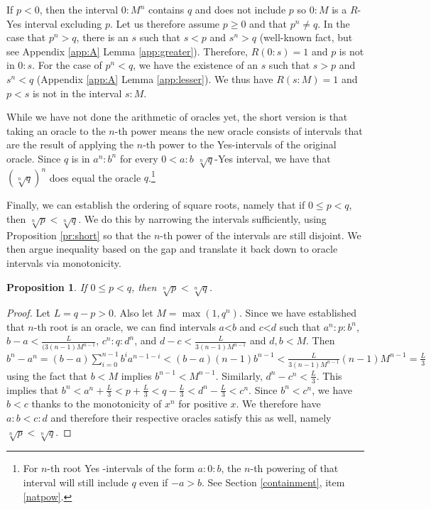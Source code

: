 \documentclass[12pt]{article}
\newtheorem{proposition}{Proposition}
\theoremstyle{remark}
\newcommand{\lt}{\mathord{<}}
\begin{document}
\begin{enumerate}
    If $p < 0$, then the interval $0:M^n$ contains $q$ and does not include $p$ so $0:M$ is a $R$-Yes interval excluding $p$. Let us therefore assume $p \geq 0$ and that $p^n \neq q$. In the case that $p^n > q$, there is an $s$ such that $s<p$ and $s^n > q$ (well-known fact, but see Appendix \ref{app:A} Lemma \ref{app:greater}). Therefore, $R(0:s) = 1$ and $p$ is not in $0:s$. For the case of $p^n < q$, we have the existence of an $s$ such that $s > p$ and $s^n < q$ (Appendix \ref{app:A} Lemma \ref{app:lesser}). We thus have $R(s:M)=1$ and $p < s$ is not in the interval $s:M$.
    
\end{enumerate}

While we have not done the arithmetic of oracles yet, the short version is that taking an oracle to the $n$-th power means the new oracle consists of intervals that are the result of applying the $n$-th power to the Yes-intervals of the original oracle. Since $q$ is in $a^n:b^n$ for every $0<a:b$ $\sqrt[n]{q}$-Yes interval, we have that $(\sqrt[n]{q})^n$ does equal the oracle $q$.\footnote{For $n$-th root Yes -intervals of the form $a:0:b$, the $n$-th powering of that interval will still include $q$ even if $-a>b$. See Section \ref{containment}, item \ref{natpow}.} 

Finally, we can establish the ordering of square roots, namely that if $0 \leq p<q$, then $\sqrt[n]{p} < \sqrt[n]{q}$. We do this by narrowing the intervals sufficiently, using Proposition \ref{pr:short} so that the $n$-th power of the intervals are still disjoint. We then argue inequality based on the gap and translate it back down to oracle intervals via monotonicity. 

\begin{proposition}
    If $0 \leq p <q$, then $\sqrt[n]{p} < \sqrt[n]{q}$.
\end{proposition}

\begin{proof}
    Let $L = q-p > 0$. Also let $M = \max(1, q^n)$.  Since we have established that $n$-th root is an oracle, we can find intervals $a\lt b$ and $c \lt d$ such that $a^n:p:b^n$, $b-a < \frac{L}{(3(n-1)M^{n-1}}$, $c^n:q:d^n$, and $d-c < \frac{L}{3(n-1)M^{n-1}}$ and $d, b < M$.  Then $b^n-a^n = (b-a) \sum_{i=0}^{n-1} b^i a^{n-1-i} < (b-a)(n-1) b^{n-1} < \frac{L}{3(n-1)M^{n-1}} (n-1) M^{n-1} = \frac{L}{3}$ using the fact that $b<M$ implies $b^{n-1} < M^{n-1}$. Similarly, $d^n-c^n < \frac{L}{3}$. This implies that $b^n < a^n + \frac{L}{3} < p + \frac{L}{3} < q -  \frac{L}{3} < d^n - \frac{L}{3} < c^n$. Since $b^n < c^n$, we have $b < c$ thanks to the monotonicity of $x^n$ for positive $x$. We therefore have $a:b < c:d$ and therefore their respective oracles satisfy this as well, namely $\sqrt[n]{p} < \sqrt[n]{q}$.
\end{proof}
\end{document}

